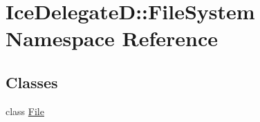 \hypertarget{namespace_ice_delegate_d_1_1_file_system}{}\section{Ice\+Delegate\+D\+:\+:File\+System Namespace Reference}
\label{namespace_ice_delegate_d_1_1_file_system}
\subsection*{Classes}
\begin{DoxyCompactItemize}
\item 
class \hyperlink{class_ice_delegate_d_1_1_file_system_1_1_file}{File}
\end{DoxyCompactItemize}
